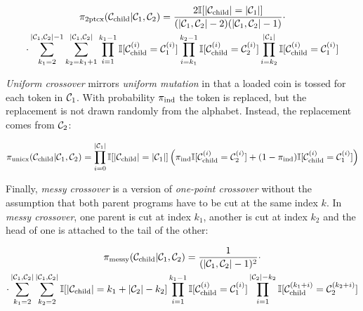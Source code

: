 \begin{multline}
    \pi_\text{2ptcx}(\mathcal{C}_\text{child}|\mathcal{C}_1,\mathcal{C}_2) =
        \frac{2 \mathbb{I} [|\mathcal{C}_\text{child}|=|\mathcal{C}_1|]}{(|\mathcal{C}_1,\mathcal{C}_2|-2)(|\mathcal{C}_1,\mathcal{C}_2|-1)} 
        \cdot \\ \cdot
        \sum\limits_{k_1=2}^{|\mathcal{C}_1,\mathcal{C}_2|-1}
        \sum\limits_{k_2=k_1+1}^{|\mathcal{C}_1,\mathcal{C}_2|} 
        \prod\limits_{i=1}^{k_1-1} \mathbb{I} [\mathcal{C}_\text{child}^{(i)} = \mathcal{C}_1^{(i)}] \prod\limits_{i=k_1}^{k_2-1} \mathbb{I} [\mathcal{C}_\text{child}^{(i)} = \mathcal{C}_2^{(i)}]
        \prod\limits_{i=k_2}^{|\mathcal{C}_1|} \mathbb{I} [\mathcal{C}_\text{child}^{(i)} = \mathcal{C}_1^{(i)}]
\end{multline}

\emph{Uniform crossover} mirrors \emph{uniform mutation} in that a loaded coin is tossed for each token in $\mathcal{C}_1$. With probability $\pi_\text{ind}$ the token is replaced, but the replacement is not drawn randomly from the alphabet. Instead, the replacement comes from $\mathcal{C}_2$:

\begin{equation}
    \pi_\text{unicx}(\mathcal{C}_\text{child}|\mathcal{C}_1,\mathcal{C}_2) = \prod\limits_{i=0}^{|\mathcal{C}_1|} \mathbb{I} [|\mathcal{C}_\text{child}|=|\mathcal{C}_1|] \\ \left(\pi_\text{ind} \mathbb{I} [\mathcal{C}_\text{child}^{(i)} = \mathcal{C}_2^{(i)}] + (1 - \pi_\text{ind}) \mathbb{I} [\mathcal{C}_\text{child}^{(i)} = \mathcal{C}_1^{(i)}] \right)
\end{equation}

Finally, \emph{messy crossover} is a version of \emph{one-point crossover} without the assumption that both parent programs have to be cut at the same index $k$.
In \emph{messy crossover}, one parent is cut at index $k_1$, another is cut at index $k_2$ and the head of one is attached to the tail of the other:

\begin{multline}
    \pi_\text{messy}(\mathcal{C}_\text{child}|\mathcal{C}_1,\mathcal{C}_2) = \frac{1}{(|\mathcal{C}_1,\mathcal{C}_2|-1)^2} \cdot \\ \cdot \sum\limits_{k_1=2}^{|\mathcal{C}_1,\mathcal{C}_2|} \sum\limits_{k_2=2}^{|\mathcal{C}_1,\mathcal{C}_2|} \mathbb{I} [|\mathcal{C}_\text{child}|=k_1+|\mathcal{C}_2|-k_2] \prod\limits_{i=1}^{k_1-1} \mathbb{I} [\mathcal{C}_\text{child}^{(i)} = \mathcal{C}_1^{(i)}] \prod\limits_{i=1}^{|\mathcal{C}_2|-k_2} \mathbb{I} [\mathcal{C}_\text{child}^{(k_1+i)} = \mathcal{C}_2^{(k_2+i)}]
\end{multline}

